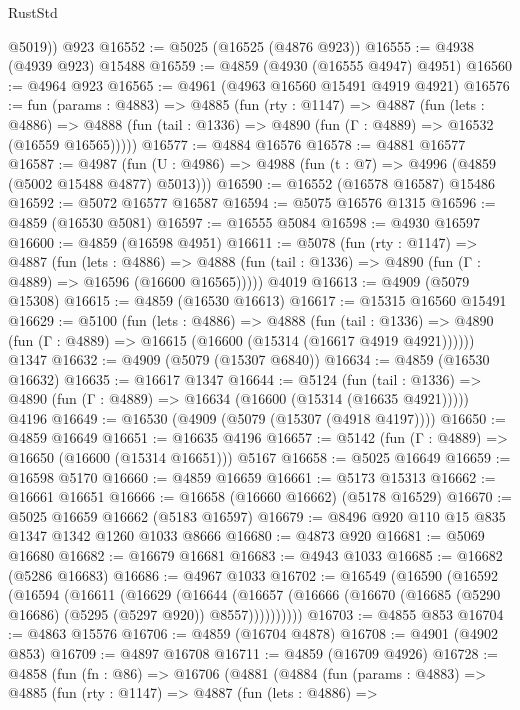 \begin{lexlean}{RustStd}
\begin{coremodule}
        @5019))
    @923
@16552 := @5025 (@16525 (@4876 @923))
@16555 := @4938 (@4939 @923) @15488
@16559 := @4859 (@4930 (@16555 @4947) @4951)
@16560 := @4964 @923
@16565 := @4961 (@4963 @16560 @15491 @4919 @4921)
@16576 := fun (params : @4883) =>
  @4885
    (fun (rty : @1147) =>
    @4887
      (fun (lets : @4886) =>
      @4888 (fun (tail : @1336) => @4890 (fun (Γ : @4889) => @16532 (@16559 @16565)))))
@16577 := @4884 @16576
@16578 := @4881 @16577
@16587 := @4987
    (fun (U : @4986) => @4988 (fun (t : @7) => @4996 (@4859 (@5002 @15488 @4877) @5013)))
@16590 := @16552 (@16578 @16587) @15486
@16592 := @5072 @16577 @16587
@16594 := @5075 @16576 @1315
@16596 := @4859 (@16530 @5081)
@16597 := @16555 @5084
@16598 := @4930 @16597
@16600 := @4859 (@16598 @4951)
@16611 := @5078
    (fun (rty : @1147) =>
    @4887
      (fun (lets : @4886) =>
      @4888 (fun (tail : @1336) => @4890 (fun (Γ : @4889) => @16596 (@16600 @16565)))))
    @4019
@16613 := @4909 (@5079 @15308)
@16615 := @4859 (@16530 @16613)
@16617 := @15315 @16560 @15491
@16629 := @5100
    (fun (lets : @4886) =>
    @4888
      (fun (tail : @1336) =>
      @4890 (fun (Γ : @4889) => @16615 (@16600 (@15314 (@16617 @4919 @4921))))))
    @1347
@16632 := @4909 (@5079 (@15307 @6840))
@16634 := @4859 (@16530 @16632)
@16635 := @16617 @1347
@16644 := @5124
    (fun (tail : @1336) => @4890 (fun (Γ : @4889) => @16634 (@16600 (@15314 (@16635 @4921)))))
    @4196
@16649 := @16530 (@4909 (@5079 (@15307 (@4918 @4197))))
@16650 := @4859 @16649
@16651 := @16635 @4196
@16657 := @5142 (fun (Γ : @4889) => @16650 (@16600 (@15314 @16651))) @5167
@16658 := @5025 @16649
@16659 := @16598 @5170
@16660 := @4859 @16659
@16661 := @5173 @15313
@16662 := @16661 @16651
@16666 := @16658 (@16660 @16662) (@5178 @16529)
@16670 := @5025 @16659 @16662 (@5183 @16597)
@16679 := @8496 @920 @110 @15 @835 @1347 @1342 @1260 @1033 @8666
@16680 := @4873 @920
@16681 := @5069 @16680
@16682 := @16679 @16681
@16683 := @4943 @1033
@16685 := @16682 (@5286 @16683)
@16686 := @4967 @1033
@16702 := @16549
    (@16590
      (@16592
        (@16594
          (@16611
            (@16629
              (@16644
                (@16657 (@16666 (@16670 (@16685 (@5290 @16686) (@5295 (@5297 @920)) @8557))))))))))
@16703 := @4855 @853
@16704 := @4863 @15576
@16706 := @4859 (@16704 @4878)
@16708 := @4901 (@4902 @853)
@16709 := @4897 @16708
@16711 := @4859 (@16709 @4926)
@16728 := @4858
    (fun (fn : @86) =>
    @16706
      (@4881
        (@4884
          (fun (params : @4883) =>
          @4885
            (fun (rty : @1147) =>
            @4887
              (fun (lets : @4886) =>

\end{coremodule}
\end{lexlean}
